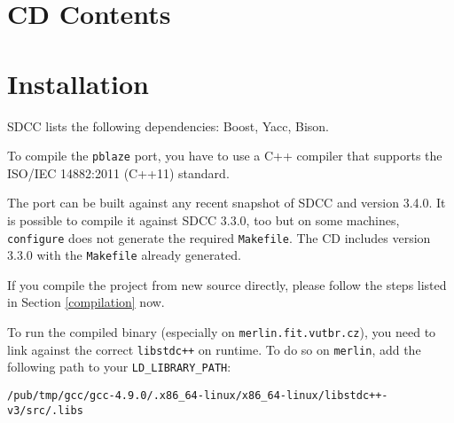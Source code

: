\chapter{CD Contents}



\chapter{Installation}

SDCC lists the following dependencies: Boost, Yacc, Bison.

To compile the \texttt{pblaze} port, you have to use a C++ compiler that supports the ISO/IEC 14882:2011 (C++11) standard.

The port can be built against any recent snapshot of SDCC and version 3.4.0. It is possible to compile it against SDCC 3.3.0, too but on some machines, \texttt{configure} does not generate the required \texttt{Makefile}. The CD includes version 3.3.0 with the \texttt{Makefile} already generated.

If you compile the project from new source directly, please follow the steps listed in Section \ref{compilation} now.

To run the compiled binary (especially on \texttt{merlin.fit.vutbr.cz}), you need to link against the correct \texttt{libstdc++} on runtime.
To do so on \texttt{merlin}, add the following path to your \texttt{LD\_LIBRARY\_PATH}:

\begin{center}\verb|/pub/tmp/gcc/gcc-4.9.0/.x86_64-linux/x86_64-linux/libstdc++-v3/src/.libs|\end{center}

